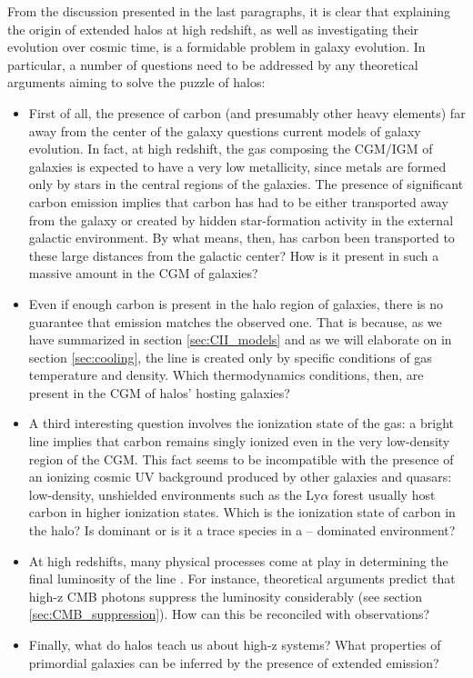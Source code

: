 From the discussion presented in the last paragraphs, it is clear that explaining the origin of extended halos at high redshift, as well as investigating their evolution over cosmic time, is a formidable problem in galaxy evolution. In particular, a number of questions need to be addressed by any theoretical arguments aiming to solve the puzzle of \CII halos:
\begin{itemize}
    \item First of all, the presence of carbon (and presumably other heavy elements) far away from the center of the galaxy questions current models of galaxy evolution. In fact, at high redshift, the gas composing the CGM/IGM of galaxies is expected to have a very low metallicity, since metals are formed only by stars in the central regions of the galaxies. The presence of significant carbon emission implies that carbon has had to be either transported away from the galaxy or created by hidden star-formation activity in the external galactic environment. By what means, then, has carbon been transported to these large distances from the galactic center? How is it present in such a massive amount in the CGM of galaxies?
    \item Even if enough carbon is present in the halo region of galaxies, there is no guarantee that \CII emission matches the observed one. That is because, as we have summarized in section \ref{sec:CII_models} and as we will elaborate on in section \ref{sec:cooling}, the \CII line is created only by specific conditions of gas temperature and density. Which thermodynamics conditions, then, are present in the CGM of halos' hosting galaxies?
    \item A third interesting question involves the ionization state of the gas: a bright \CII line implies that carbon remains singly ionized even in the very low-density region of the CGM. This fact seems to be incompatible with the presence of an ionizing cosmic UV background produced by other galaxies and quasars: low-density, unshielded environments such as the Ly$\alpha$ forest \citep[e.g.,][]{Dodorico13} usually host carbon in higher ionization states. Which is the ionization state of carbon in the halo? Is \CIIion dominant or is it a trace species in a \CIIIion -- dominated environment?
    \item At high redshifts, many physical processes come at play in determining the final luminosity of the \CII line \citep[e.g.,][]{gong2012, vallini2015, kohandel:2019}. For instance, theoretical arguments predict that high-z CMB photons suppress the \CII luminosity considerably (see section \ref{sec:CMB_suppression}). How can this be reconciled with observations? 
    \item Finally, what do \CII halos teach us about high-z systems? What properties of primordial galaxies can be inferred by the presence of extended \CII emission? 
\end{itemize} 

